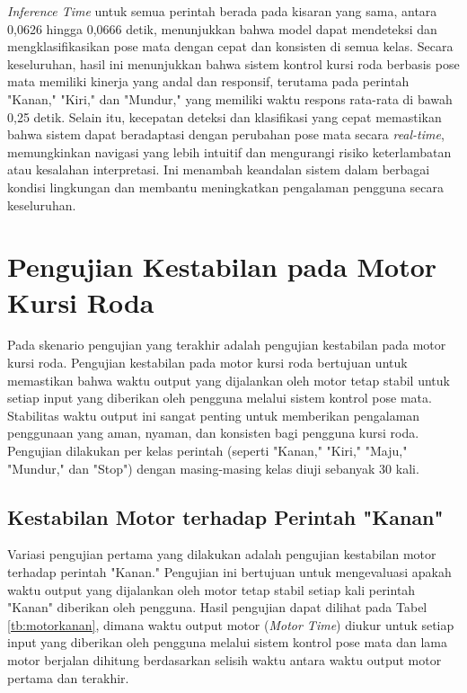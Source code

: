 \emph{Inference Time} untuk semua perintah berada pada kisaran yang sama, antara 0,0626 hingga 0,0666 detik, menunjukkan bahwa model dapat mendeteksi dan mengklasifikasikan pose mata dengan cepat dan konsisten di semua kelas. Secara keseluruhan, hasil ini menunjukkan bahwa sistem kontrol kursi roda berbasis pose mata memiliki kinerja yang andal dan responsif, terutama pada perintah "Kanan," "Kiri," dan "Mundur," yang memiliki waktu respons rata-rata di bawah 0,25 detik. Selain itu, kecepatan deteksi dan klasifikasi yang cepat memastikan bahwa sistem dapat beradaptasi dengan perubahan pose mata secara \emph{real-time}, memungkinkan navigasi yang lebih intuitif dan mengurangi risiko keterlambatan atau kesalahan interpretasi. Ini menambah keandalan sistem dalam berbagai kondisi lingkungan dan membantu meningkatkan pengalaman pengguna secara keseluruhan.

\section{Pengujian Kestabilan pada Motor Kursi Roda}

Pada skenario pengujian yang terakhir adalah pengujian kestabilan pada motor kursi roda. Pengujian kestabilan pada motor kursi roda bertujuan untuk memastikan bahwa waktu output yang dijalankan oleh motor tetap stabil untuk setiap input yang diberikan oleh pengguna melalui sistem kontrol pose mata. Stabilitas waktu output ini sangat penting untuk memberikan pengalaman penggunaan yang aman, nyaman, dan konsisten bagi pengguna kursi roda. Pengujian dilakukan per kelas perintah (seperti "Kanan," "Kiri," "Maju," "Mundur," dan "Stop") dengan masing-masing kelas diuji sebanyak 30 kali.

\subsection{Kestabilan Motor terhadap Perintah "Kanan"}

Variasi pengujian pertama yang dilakukan adalah pengujian kestabilan motor terhadap perintah "Kanan." Pengujian ini bertujuan untuk mengevaluasi apakah waktu output yang dijalankan oleh motor tetap stabil setiap kali perintah "Kanan" diberikan oleh pengguna. Hasil pengujian dapat dilihat pada Tabel \ref{tb:motorkanan}, dimana waktu output motor (\emph{Motor Time}) diukur untuk setiap input yang diberikan oleh pengguna melalui sistem kontrol pose mata dan lama motor berjalan dihitung berdasarkan selisih waktu antara waktu output motor pertama dan terakhir.


